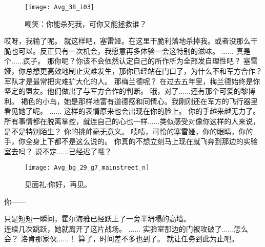 \documentclass[openany]{book}
\begin{document}
\begin{figure}[h]
    \caption*{嘲笑：你能杀死我，可你又能拯救谁？}
    \centering
    \texttt{[image: Avg\_38\_i03]}
\end{figure}
\begin{dialogue}
     哎呀，我输了呢。
     就这样吧，塞雷娅。在这里干脆利落地杀掉我。或者没那么干脆也可以。反正只有一次机会，我愿意再多体验一会这特别的滋味。
     ......
     真是个......疯子。
     那你呢？你该不会依然认定自己的所作所为全部发自理性吧？
     塞雷娅，你总想更高效地制止灾难发生，那你已经站在门口了，为什么不和军方合作？
     军队才是最常把灾难扩大化的人。
     那梅兰德呢？
     在过去五年里，梅兰德始终是你坚定的盟友。他们做出了与军方合作的判断。
     哦，对了......还有那个可爱的黎博利。
     褐色的小鸟，她是那样地富有道德感和同情心。我刚刚还在军方的飞行器里看见她了呢。
     ......
     这样的表情原来也会出现在你的脸上。
     你的手越来越无力了。所有事情都在脱离掌控，就连自己的心也一样......类似感受对像你这样的人来说，是不是特别陌生？
     你的挑衅毫无意义。
     啧啧，可怜的塞雷娅，你的眼睛，你的手，你全身上下都不是这么说的。
     你真的不想立刻马上现在就飞奔到那边的实验室去吗？
     说不定......已经迟了哦？
    \begin{figure}[h]
        \caption*{见面礼:你好，再见。}
        \centering
        \texttt{[image: Avg\_bg\_29\_g7\_mainstreet\_n]}
    \end{figure}
     你——\par
    只是短短一瞬间，霍尔海雅已经跃上了一旁半坍塌的高墙。\\
    连续几次跳跃，她就离开了这片战场。
     ......
     实验室那边的门被攻破了......怎么会？
     洛肯那家伙......！
     算了，时间差不多也到了。
     就让任务到此为止吧。
\end{dialogue}
\end{document}
